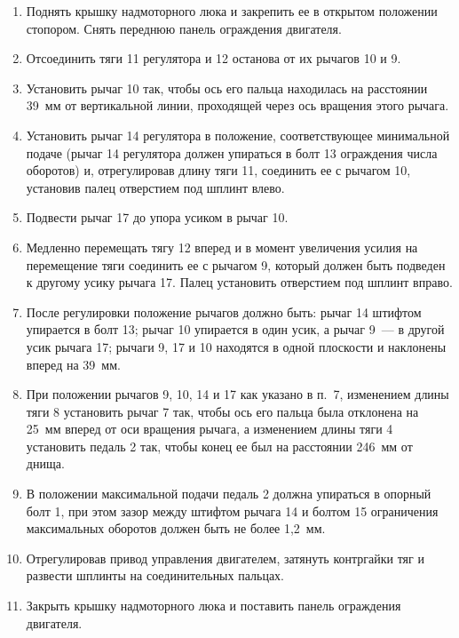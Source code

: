 \begin{enumerate}
    \item Поднять крышку надмоторного люка и закрепить ее в открытом положении стопором. Снять переднюю панель ограждения двигателя. 
    \item Отсоединить тяги 11 регулятора и 12 останова от их рычагов 10 и 9. 
    \item Установить рычаг 10 так, чтобы ось его пальца находилась на расстоянии 39~мм от вертикальной линии, проходящей через ось вращения этого рычага. 
    \item Установить рычаг 14 регулятора в положение, соответствующее минимальной подаче (рычаг 14 регулятора должен упираться в болт 13 ограждения числа оборотов) и, отрегулировав длину тяги 11, соединить ее с рычагом 10, установив палец отверстием под шплинт влево. 
    \item Подвести рычаг 17 до упора усиком в рычаг 10. 
    \item Медленно перемещать тягу 12 вперед и в момент увеличения усилия на перемещение тяги соединить ее с рычагом 9, который должен быть подведен к другому усику рычага 17. Палец установить отверстием под шплинт вправо. 
    \item После регулировки положение рычагов должно быть: рычаг 14 штифтом упирается в болт 13; рычаг 10 упирается в один усик, а рычаг 9~--- в другой усик рычага 17; рычаги 9, 17 и 10 находятся в одной плоскости и наклонены вперед на 39~мм. 
    

    \item При положении рычагов 9, 10, 14 и 17 как указано в п.~7, изменением длины тяги 8 установить рычаг 7 так, чтобы ось его пальца была отклонена на 25~мм вперед от оси вращения рычага, а изменением длины тяги 4 установить педаль 2 так, чтобы конец ее был на расстоянии 246~мм от днища. 
    \item В положении максимальной подачи педаль 2 должна упираться в опорный болт 1, при этом зазор между штифтом рычага 14 и болтом 15 ограничения максимальных оборотов должен быть не более 1,2~мм. 
    \item Отрегулировав привод управления двигателем, затянуть контргайки тяг и развести шплинты на соединительных пальцах. 
    \item Закрыть крышку надмоторного люка и поставить панель ограждения двигателя. 
\end{enumerate}



